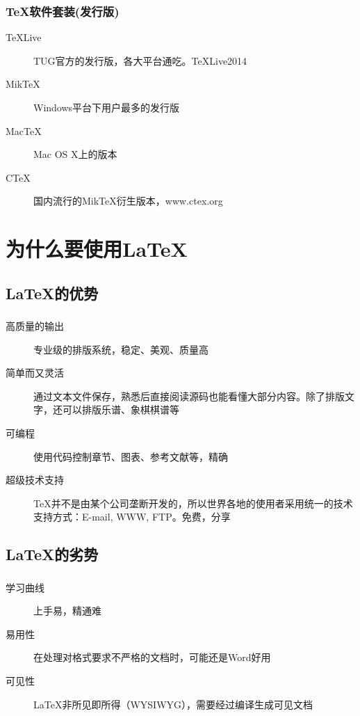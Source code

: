 \documentclass{beamer}
\begin{document}
  \frame
  {
    \frametitle{\TeX 软件套装(发行版)}
    \begin{description}
    \item[TeXLive]
      TUG官方的发行版，各大平台通吃。TeXLive2014
    \item[MikTeX]
      Windows平台下用户最多的发行版
    \item[MacTeX]
      Mac OS X上的版本
    \item[CTeX]
      国内流行的MikTeX衍生版本，www.ctex.org
    \end{description}
  }


  \section{为什么要使用\LaTeX}

  \subsection{\LaTeX 的优势}
  \frame
  {
    \frametitle{\subsecname}
    \begin{description}
    \item[高质量的输出]
      专业级的排版系统，稳定、美观、质量高
    \item[简单而又灵活]
      通过文本文件保存，熟悉后直接阅读源码也能看懂大部分内容。除了排版文字，还可以排版乐谱、象棋棋谱等
    \item[可编程]
      使用代码控制章节、图表、参考文献等，精确
    \item[超级技术支持]
      \TeX 并不是由某个公司垄断开发的，所以世界各地的使用者采用统一的技术支持方式：E-mail, WWW, FTP。免费，分享
    \end{description}
  }

  \subsection{\LaTeX 的劣势}
  \frame
  {
    \frametitle{\subsecname}
    \begin{description}
    \item[学习曲线]
      上手易，精通难
    \item[易用性]
      在处理对格式要求不严格的文档时，可能还是Word好用
    \item[可见性]
      \LaTeX 非所见即所得（WYSIWYG），需要经过编译生成可见文档
    \end{description}
  }
\end{document}
